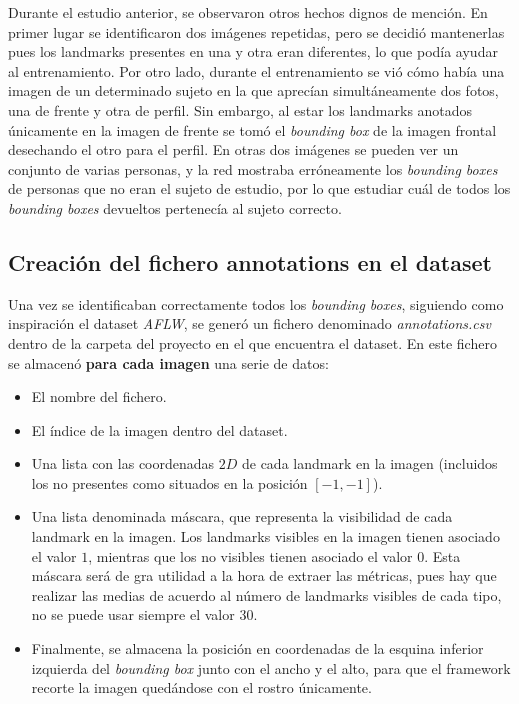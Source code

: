             \noindent Durante el estudio anterior, se observaron otros hechos dignos de mención. En primer lugar se identificaron dos imágenes repetidas, pero se decidió mantenerlas pues los landmarks presentes en una y otra eran diferentes, lo que podía ayudar al entrenamiento. Por otro lado, durante el entrenamiento se vió cómo había una imagen de un determinado sujeto en la que aprecían simultáneamente dos fotos, una  de frente y otra de perfil. Sin embargo, al estar los landmarks anotados únicamente en la imagen de frente se tomó el \textit{bounding box} de la imagen frontal desechando el otro para el perfil. En otras dos imágenes se pueden ver un conjunto de varias personas, y la red mostraba erróneamente los \textit{bounding boxes} de personas que no eran el sujeto de estudio, por lo que estudiar cuál de todos los \textit{bounding boxes} devueltos pertenecía al sujeto correcto.

        \subsection{Creación del fichero annotations en el dataset}

            \noindent Una vez se identificaban correctamente todos los \textit{bounding boxes}, siguiendo como inspiración el dataset \textit{AFLW}, se generó un fichero denominado \textit{annotations.csv} dentro de la carpeta del proyecto en el que encuentra el dataset. En este fichero se almacenó \textbf{para cada imagen} una serie de datos: 

            \begin{itemize}
                \item El nombre del fichero.
                \item El índice de la imagen dentro del dataset. 
                \item Una lista con las coordenadas $2D$ de cada landmark en la imagen (incluidos los no presentes como situados en la posición $[-1,-1]$). 
                \item Una lista denominada máscara, que representa la visibilidad de cada landmark en la imagen. Los landmarks visibles en la imagen tienen asociado el valor $1$, mientras que los no visibles tienen asociado el valor $0$. Esta máscara será de gra utilidad a la hora de extraer las métricas, pues hay que realizar las medias de acuerdo al número de landmarks visibles de cada tipo, no se puede usar siempre el valor $30$.
                \item Finalmente, se almacena la posición en coordenadas de la esquina inferior izquierda del \textit{bounding box} junto con el ancho y el alto, para que el framework recorte la imagen quedándose con el rostro únicamente. 
            \end{itemize}

